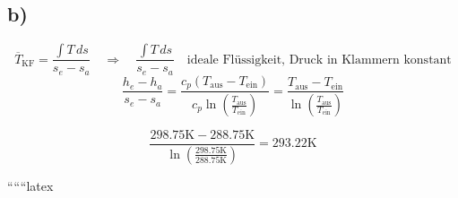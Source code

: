 

\subsection*{b)}
\[
\overline{T}_{\text{KF}} = \frac{\int T \, ds}{s_e - s_a} \quad \Rightarrow \quad \frac{\int T \, ds}{s_e - s_a} \quad \text{ideale Flüssigkeit, Druck in Klammern konstant}
\]
\[
\frac{h_e - h_a}{s_e - s_a} = \frac{c_p (T_{\text{aus}} - T_{\text{ein}})}{c_p \ln \left( \frac{T_{\text{aus}}}{T_{\text{ein}}} \right)} = \frac{T_{\text{aus}} - T_{\text{ein}}}{\ln \left( \frac{T_{\text{aus}}}{T_{\text{ein}}} \right)}
\]

\[
\frac{298.75 \text{K} - 288.75 \text{K}}{\ln \left( \frac{298.75 \text{K}}{288.75 \text{K}} \right)} = 293.22 \text{K}
\]

``````latex